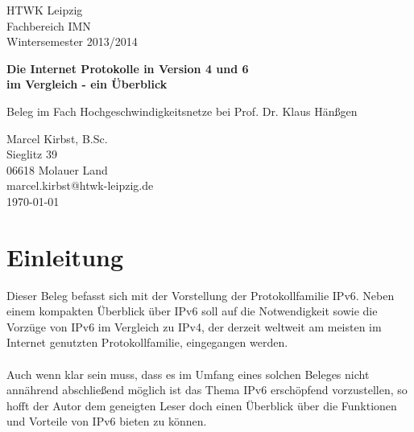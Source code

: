 \documentclass[a4paper,12pt]{scrartcl}
\begin{document}
 
\begin{titlepage}
\begin{small}
\vfill {HTWK Leipzig\\
Fachbereich IMN \\
Wintersemester 2013/2014}
\end{small}
 
\begin{center}
\begin{Large}
\vfill {\textsf{\textbf{
Die Internet Protokolle in Version 4 und 6\\
im Vergleich - ein \"Uberblick\\
}}}
\end{Large}
Beleg im Fach Hochgeschwindigkeitsnetze bei  Prof. Dr. Klaus Hänßgen
\end{center}
 
\begin{small}

\vfill
Marcel Kirbst, B.Sc. \\ Sieglitz 39 \\ 06618 Molauer Land \\
marcel.kirbst@htwk-leipzig.de\\
\today
\end{small}
 
\end{titlepage}
 
\tableofcontents
\thispagestyle{empty}
 
\clearpage
 
\onehalfspacing
 
\pagestyle{plain}
 
\section{Einleitung}
Dieser Beleg befasst sich mit der Vorstellung der Protokollfamilie IPv6. Neben einem kompakten Überblick über IPv6 soll auf die Notwendigkeit sowie die Vorzüge von IPv6 im Vergleich zu IPv4, der derzeit weltweit am meisten im Internet genutzten Protokollfamilie, eingegangen werden.\\
\\

Auch wenn klar sein muss, dass es im Umfang eines solchen Beleges nicht ann\"ahrend abschlie{\ss}end m\"oglich ist das Thema IPv6 ersch\"opfend vorzustellen, so hofft der Autor dem geneigten Leser doch einen \"Uberblick \"uber die Funktionen und Vorteile von IPv6 bieten zu k\"onnen.
\end{document}
